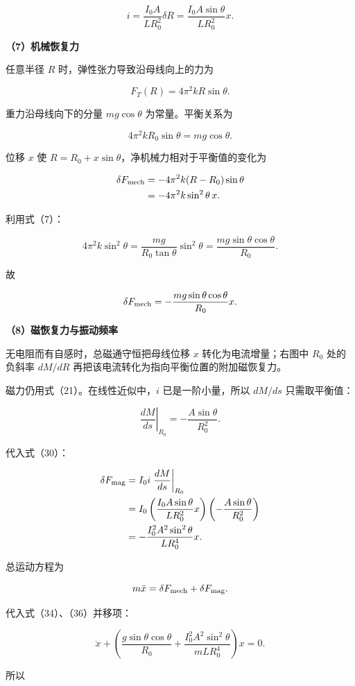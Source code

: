 \documentclass[12pt,a4paper,UTF8]{ctexart}
\begin{document}
\[i=\frac{I_0A}{LR_0^2}\delta R
=\frac{I_0A\sin\theta}{LR_0^2}x.\]

\textbf{（7）机械恢复力}

任意半径 \(R\) 时，弹性张力导致沿母线向上的力为

\[F_T(R)=4\pi^2kR\sin\theta.\]

重力沿母线向下的分量 \(mg\cos\theta\) 为常量。平衡关系为

\[4\pi^2kR_0\sin\theta=mg\cos\theta.\]

位移 \(x\) 使 \(R=R_0+x\sin\theta\)，净机械力相对于平衡值的变化为

\[\begin{aligned}
\delta F_{\rm mech}
&=-4\pi^2k(R-R_0)\sin\theta\\
&=-4\pi^2k\sin^2\theta\,x.
\end{aligned}\]

利用式（7）：

\[4\pi^2k\sin^2\theta
=\frac{mg}{R_0\tan\theta}\sin^2\theta
=\frac{mg\sin\theta\cos\theta}{R_0}.\]

故

\[\delta F_{\rm mech}
=-\frac{mg\sin\theta\cos\theta}{R_0}x.\]

\textbf{（8）磁恢复力与振动频率}

无电阻而有自感时，总磁通守恒把母线位移 \(x\) 转化为电流增量；右图中
\(R_0\) 处的负斜率 \(dM/dR\)
再把该电流转化为指向平衡位置的附加磁恢复力。

磁力仍用式（21）。在线性近似中，\(i\) 已是一阶小量，所以 \(dM/ds\)
只需取平衡值：

\[\left.\frac{dM}{ds}\right|_{R_0}
=-\frac{A\sin\theta}{R_0^2}.\]

代入式（30）：

\[\begin{aligned}
\delta F_{\rm mag}
&=I_0i\left.\frac{dM}{ds}\right|_{R_0}\\
&=I_0\left(\frac{I_0A\sin\theta}{LR_0^2}x\right)
\left(-\frac{A\sin\theta}{R_0^2}\right)\\
&=-\frac{I_0^2A^2\sin^2\theta}{LR_0^4}x.
\end{aligned}\]

总运动方程为

\[m\ddot x=\delta F_{\rm mech}+\delta F_{\rm mag}.\]

代入式（34）、（36）并移项：

\[\ddot x+\left(
\frac{g\sin\theta\cos\theta}{R_0}
+\frac{I_0^2A^2\sin^2\theta}{mLR_0^4}
\right)x=0.\]

所以
\end{document}
